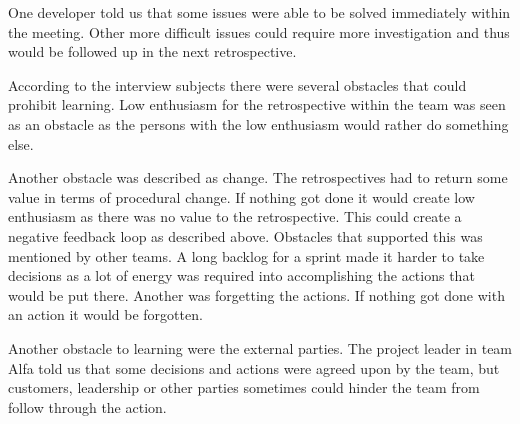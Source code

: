 One developer told us that some issues were able to be solved immediately within the meeting. Other more difficult issues could require more investigation and thus would be followed up in the next retrospective. 

\begin{table}[!h]
	\begin{center}
	\caption{Root-Cause identifying techniques used.}
	\label{table:root-cause-technique}
	\end{center}
\end{table}

\label{question-14}
According to the interview subjects there were several obstacles that could prohibit learning. Low enthusiasm for the retrospective within the team was seen as an obstacle as the persons with the low enthusiasm would rather do something else. 

Another obstacle was described as change. The retrospectives had to return some value in terms of procedural change. If nothing got done it would create low enthusiasm as there was no value to the retrospective. This could create a negative feedback loop as described above. Obstacles that supported this was mentioned by other teams. A long backlog for a sprint made it harder to take decisions as a lot of energy was required into accomplishing the actions that would be put there. Another was forgetting the actions. If nothing got done with an action it would be forgotten.

Another obstacle to learning were the external parties. The project leader in team Alfa told us that some decisions and actions were agreed upon by the team, but customers, leadership or other parties sometimes could hinder the team from follow through the action. 

